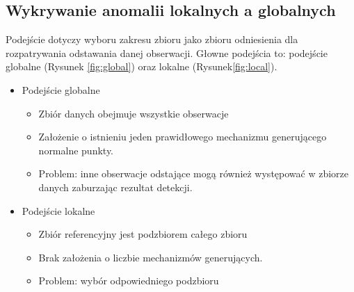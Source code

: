 \subsection{Wykrywanie anomalii lokalnych a globalnych}
Podejście dotyczy wyboru zakresu zbioru jako zbioru odniesienia dla rozpatrywania odstawania danej obserwacji. Głowne podejścia to: podejście globalne (Rysunek \ref{fig:global}) oraz lokalne (Rysunek\ref{fig:local}).
\begin{itemize}
    \item Podejście globalne 
    \begin{itemize}
        \item Zbiór danych obejmuje wszystkie obserwacje
        \item Założenie o istnieniu jeden prawidłowego mechanizmu generującego normalne punkty.
        \item Problem: inne obserwacje odstające mogą również występować w zbiorze danych zaburzając rezultat detekcji.
    \end{itemize}
    \item Podejście lokalne 
    \begin{itemize}
        \item Zbiór referencyjny jest podzbiorem całego zbioru
        \item Brak założenia o liczbie mechanizmów generujących.
        \item Problem: wybór odpowiedniego podzbioru
    \end{itemize}
\end{itemize}

